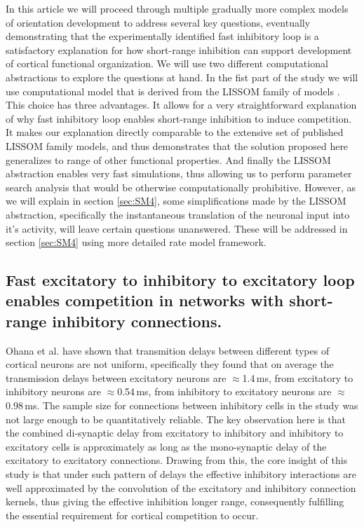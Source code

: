 \documentclass[a4paper,10pt]{article}
\begin{document}
In this article we will proceed through multiple gradually more complex models of orientation development to address several key questions,
eventually demonstrating that the experimentally identified fast inhibitory loop is a satisfactory explanation for how short-range 
inhibition can support development of cortical functional organization. We will use two different computational abstractions 
to explore the questions at hand. In the fist part of the study we will use computational model that is derived from the LISSOM 
family of models \cite{CMVC}. This choice has three advantages. It allows for a very straightforward explanation of why 
fast inhibitory loop enables short-range inhibition to induce competition. It makes our explanation directly comparable to the 
extensive set of published LISSOM family models, and thus demonstrates that the solution proposed here generalizes to range of other 
functional properties. And finally the LISSOM abstraction enables very fast simulations, thus allowing us to perform 
parameter search analysis that would be otherwise computationally prohibitive. However, as we will explain in section \ref{sec:SM4}, some simplifications
made by the LISSOM abstraction, specifically the instantaneous translation of the neuronal input into it's activity, will leave 
certain questions unanswered. These will be addressed in section \ref{sec:SM4} using more detailed rate model framework.


\subsection{Fast excitatory to inhibitory to excitatory loop enables competition in networks with short-range inhibitory connections.} \label{sec:SM1}

Ohana et al. \cite{Ohana2012} have shown that transmition delays between different types of cortical neurons are not uniform, specifically they found that on average the transmission delays  between excitatory neurons are $\approx$1.4\,ms, from excitatory to inhibitory neurons are $\approx$0.54\,ms, from inhibitory to excitatory neurons are $\approx$0.98\,ms. The sample size for connections
between inhibitory cells in the study was not large enough to be quantitatively reliable. The key observation here is that the 
combined di-synaptic delay from excitatory to inhibitory and inhibitory to excitatory cells is approximately as long as the mono-synaptic delay
of the excitatory to excitatory connections. Drawing from this, the core insight of this study is that under such pattern of delays
the effective inhibitory interactions are well approximated by the convolution of the excitatory and inhibitory connection kernels, thus 
giving the effective inhibition longer range, consequently fulfilling the essential requirement for cortical competition to occur.
\end{document}
